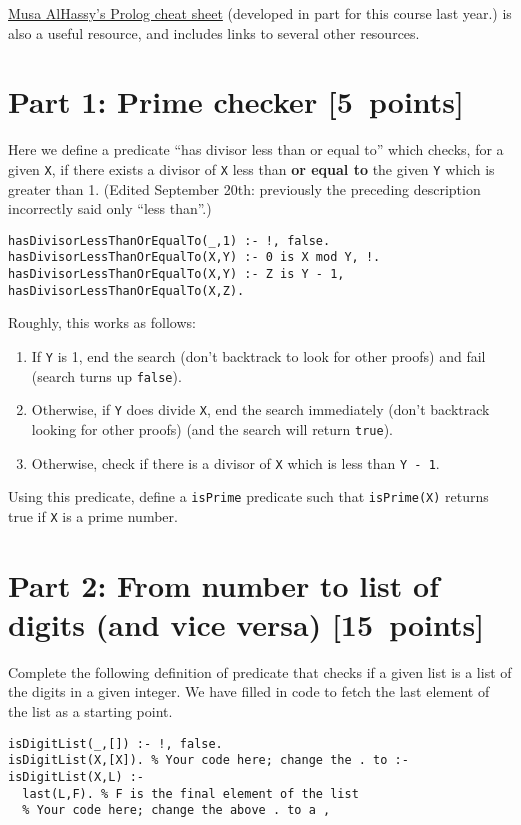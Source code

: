 \documentclass[11pt]{article}
\begin{document}
\href{https://github.com/alhassy/PrologCheatSheet}{Musa AlHassy's Prolog cheat sheet}
(developed in part for this course last year.)
is also a useful resource, and
includes links to several other resources.

\section*{Part 1: Prime checker                                  [5 points]}
\label{sec:orga0640a0}
Here we define a predicate “has divisor less than or equal to”
which checks, for a given \texttt{X}, if there exists a divisor
of \texttt{X} less than \textbf{or equal to} the given \texttt{Y} which is greater than 1.
(Edited September 20th: previously the preceding description
incorrectly said only “less than”.)
\begin{verbatim}
hasDivisorLessThanOrEqualTo(_,1) :- !, false.
hasDivisorLessThanOrEqualTo(X,Y) :- 0 is X mod Y, !.
hasDivisorLessThanOrEqualTo(X,Y) :- Z is Y - 1, hasDivisorLessThanOrEqualTo(X,Z).
\end{verbatim}
Roughly, this works as follows:
\begin{enumerate}
\item If \texttt{Y} is 1, end the search (don't backtrack to look for other proofs)
and fail (search turns up \texttt{false}).
\item Otherwise, if \texttt{Y} does divide \texttt{X}, end the search immediately
(don't backtrack looking for other proofs)
(and the search will return \texttt{true}).
\item Otherwise, check if there is a divisor of \texttt{X} which is less than \texttt{Y - 1}.
\end{enumerate}

Using this predicate, define a \texttt{isPrime} predicate
such that \texttt{isPrime(X)} returns true if \texttt{X} is a prime number.

\section*{Part 2: From number to list of digits (and vice versa) [15 points]}
\label{sec:orgc62485a}
Complete the following definition of predicate that checks
if a given list is a list of the digits in a given integer.
We have filled in code to fetch the last element of the list
as a starting point.
\begin{verbatim}
isDigitList(_,[]) :- !, false.
isDigitList(X,[X]). % Your code here; change the . to :-
isDigitList(X,L) :-
  last(L,F). % F is the final element of the list
  % Your code here; change the above . to a ,
\end{verbatim}
\end{document}
